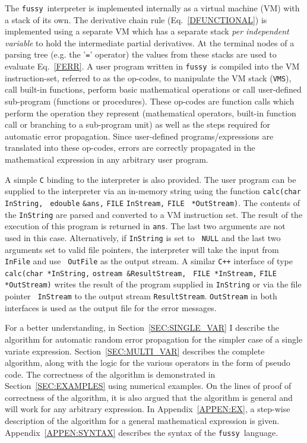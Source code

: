 \documentclass[12pt]{article}
\newcommand{\Fussy}{{\tt fussy}}
\newcommand{\VMS}{{\tt VMS}}
\begin{document}
The \Fussy\ interpreter is implemented internally as a virtual machine
(VM) with a stack of its own.  The derivative chain rule
(Eq.~\ref{DFUNCTIONAL}) is implemented using a separate VM which has a
separate stack {\it per independent variable} to hold the intermediate
partial derivatives.  At the terminal nodes of a parsing tree (e.g.
the '{\tt =}' operator) the values from these stacks are used to
evaluate Eq.~\ref{FERR}.  A user program written in \Fussy\ is
compiled into the VM instruction-set, referred to as the op-codes, to
manipulate the VM stack (\VMS), call built-in functions, perform basic
mathematical operations or call user-defined sub-program (functions or
procedures).  These op-codes are function calls which perform the
operation they represent (mathematical operators, built-in function
call or branching to a sub-program unit) as well as the steps required
for automatic error propagation.  Since user-defined
programs/expressions are translated into these op-codes, errors are
correctly propagated in the mathematical expression in any arbitrary
user program.

A simple {\tt C} binding to the interpreter is also provided.  The
user program can be supplied to the interpreter via an in-memory
string using the function {\tt calc(char} {\tt *InString,} {\tt
edouble} {\tt \&ans,} {\tt FILE} {\tt *InStream,} {\tt FILE} {\tt
*OutStream)}.  The contents of the {\tt InString} are parsed and
converted to a VM instruction set.  The result of the execution of
this program is returned in {\tt ans}.  The last two arguments are not
used in this case.  Alternatively, if {\tt InString} is set to {\tt
NULL} and the last two arguments set to valid file pointers, the
interpreter will take the input from {\tt InFile} and use {\tt
OutFile} as the output stream.  A similar {\tt C++} interface of type
{\tt calc(}{\tt char *InString,} {\tt ostream \&ResultStream,} {\tt
FILE *InStream,} {\tt FILE *OutStream)} writes the result of the
program supplied in {\tt InString} or via the file pointer {\tt
InStream} to the output stream {\tt ResultStream}.  {\tt OutStream} in
both interfaces is used as the output file for the error messages.

For a better understanding, in Section~\ref{SEC:SINGLE_VAR} I describe
the algorithm for automatic random error propagation for the simpler
case of a single variate expression.  Section~\ref{SEC:MULTI_VAR}
describes the complete algorithm, along with the logic for the various
operators in the form of pseudo code.  The correctness of the
algorithm is demonstrated in Section~\ref{SEC:EXAMPLES} using
numerical examples.  On the lines of proof of correctness of the
algorithm, it is also argued that the algorithm is general and will
work for any arbitrary expression.  In Appendix~\ref{APPEN:EX}, a
step-wise description of the algorithm for a general mathematical
expression is given.  Appendix~\ref{APPEN:SYNTAX} describes the syntax
of the \Fussy\ language.
\end{document}
